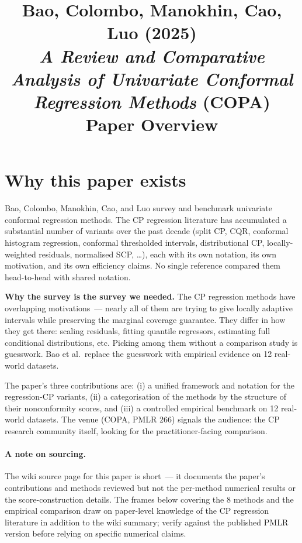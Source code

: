 \documentclass[letterpaper,11pt,leqno]{article}
\title{Bao, Colombo, Manokhin, Cao, Luo (2025)\\\textit{A Review and Comparative Analysis of Univariate Conformal Regression Methods} (COPA)\\[2pt]\large Paper Overview}
\author{}
\date{}
\begin{document}
\maketitle

\section{Why this paper exists}\label{s:intro}

Bao, Colombo, Manokhin, Cao, and Luo \cite{bao2025review} survey and benchmark univariate conformal regression methods. The CP regression literature has accumulated a substantial number of variants over the past decade (split CP, CQR, conformal histogram regression, conformal thresholded intervals, distributional CP, locally-weighted residuals, normalised SCP, \ldots), each with its own notation, its own motivation, and its own efficiency claims. No single reference compared them head-to-head with shared notation.

\begin{keyinsight}
\textbf{Why the survey is the survey we needed.} The CP regression methods have overlapping motivations~--- nearly all of them are trying to give locally adaptive intervals while preserving the marginal coverage guarantee. They differ in how they get there: scaling residuals, fitting quantile regressors, estimating full conditional distributions, etc. Picking among them without a comparison study is guesswork. Bao et al.~replace the guesswork with empirical evidence on 12 real-world datasets.
\end{keyinsight}

The paper's three contributions are: (i) a unified framework and notation for the regression-CP variants, (ii) a categorisation of the methods by the structure of their nonconformity scores, and (iii) a controlled empirical benchmark on 12 real-world datasets. The venue (COPA, PMLR 266) signals the audience: the CP research community itself, looking for the practitioner-facing comparison.

\paragraph{A note on sourcing.} The wiki source page for this paper is short~--- it documents the paper's contributions and methods reviewed but not the per-method numerical results or the score-construction details. The frames below covering the 8 methods and the empirical comparison draw on paper-level knowledge of the CP regression literature in addition to the wiki summary; verify against the published PMLR version before relying on specific numerical claims.
\end{document}
